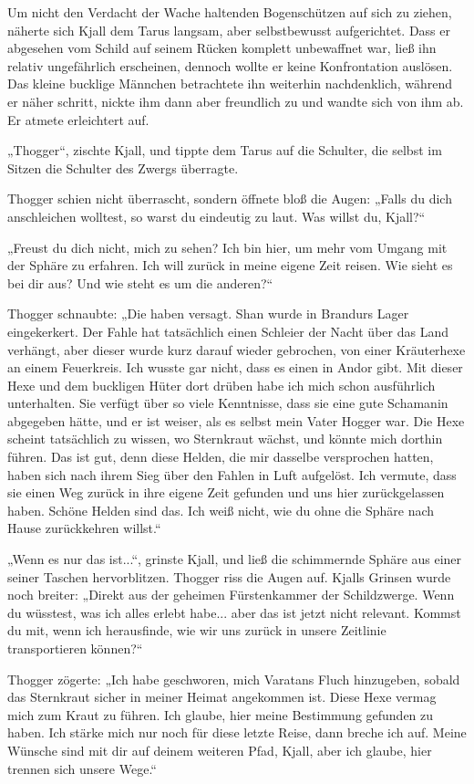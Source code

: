 Um nicht den Verdacht der Wache haltenden Bogenschützen auf sich zu ziehen, näherte sich Kjall dem Tarus langsam, aber selbstbewusst aufgerichtet. Dass er abgesehen vom Schild auf seinem Rücken komplett unbewaffnet war, ließ ihn relativ ungefährlich erscheinen, dennoch wollte er keine Konfrontation auslösen. Das kleine bucklige Männchen betrachtete ihn weiterhin nachdenklich, während er näher schritt, nickte ihm dann aber freundlich zu und wandte sich von ihm ab. Er atmete erleichtert auf.

„Thogger“, zischte Kjall, und tippte dem Tarus auf die Schulter, die selbst im Sitzen die Schulter des Zwergs überragte.

Thogger schien nicht überrascht, sondern öffnete bloß die Augen: „Falls du dich anschleichen wolltest, so warst du eindeutig zu laut. Was willst du, Kjall?“

„Freust du dich nicht, mich zu sehen? Ich bin hier, um mehr vom Umgang mit der Sphäre zu erfahren. Ich will zurück in meine eigene Zeit reisen. Wie sieht es bei dir aus? Und wie steht es um die anderen?“

Thogger schnaubte: „Die haben versagt. Shan wurde in Brandurs Lager eingekerkert. Der Fahle hat tatsächlich einen Schleier der Nacht über das Land verhängt, aber dieser wurde kurz darauf wieder gebrochen, von einer Kräuterhexe an einem Feuerkreis. Ich wusste gar nicht, dass es einen in Andor gibt. Mit dieser Hexe und dem buckligen Hüter dort drüben habe ich mich schon ausführlich unterhalten. Sie verfügt über so viele Kenntnisse, dass sie eine gute Schamanin abgegeben hätte, und er ist weiser, als es selbst mein Vater Hogger war. Die Hexe scheint tatsächlich zu wissen, wo Sternkraut wächst, und könnte mich dorthin führen. Das ist gut, denn diese Helden, die mir dasselbe versprochen hatten, haben sich nach ihrem Sieg über den Fahlen in Luft aufgelöst. Ich vermute, dass sie einen Weg zurück in ihre eigene Zeit gefunden und uns hier zurückgelassen haben. Schöne Helden sind das. Ich weiß nicht, wie du ohne die Sphäre nach Hause zurückkehren willst.“

„Wenn es nur das ist...“, grinste Kjall, und ließ die schimmernde Sphäre aus einer seiner Taschen hervorblitzen. Thogger riss die Augen auf. Kjalls Grinsen wurde noch breiter: „Direkt aus der geheimen Fürstenkammer der Schildzwerge. Wenn du wüsstest, was ich alles erlebt habe... aber das ist jetzt nicht relevant. Kommst du mit, wenn ich herausfinde, wie wir uns zurück in unsere Zeitlinie transportieren können?“

Thogger zögerte: „Ich habe geschworen, mich Varatans Fluch hinzugeben, sobald das Sternkraut sicher in meiner Heimat angekommen ist. Diese Hexe vermag mich zum Kraut zu führen. Ich glaube, hier meine Bestimmung gefunden zu haben. Ich stärke mich nur noch für diese letzte Reise, dann breche ich auf. Meine Wünsche sind mit dir auf deinem weiteren Pfad, Kjall, aber ich glaube, hier trennen sich unsere Wege.“


